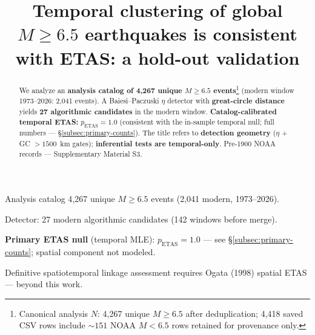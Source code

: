 \documentclass[draft]{agujournal2019}
\begin{document}
\title{Temporal clustering of global $M \ge 6.5$ earthquakes is consistent with ETAS: a hold-out validation}




\begin{abstract}
We analyze an \textbf{analysis catalog of 4{,}267 unique $M \ge 6.5$ events}\footnote{Canonical
analysis $N$: 4{,}267 unique $M \ge 6.5$ after deduplication; 4{,}418 saved CSV rows
include ${\sim}151$ NOAA $M < 6.5$ rows retained for provenance only.} (modern window
1973--2026: 2{,}041 events).
A Baiesi--Paczuski $\eta$ detector with \textbf{great-circle distance} yields
\textbf{27 algorithmic candidates} in the modern window.
\textbf{Catalog-calibrated temporal ETAS:} $p_\mathrm{ETAS}=1.0$ (consistent with the
in-sample temporal null; full numbers --- \S\ref{subsec:primary-counts}).
The title refers to \textbf{detection geometry} ($\eta$ + GC $> 1500$~km gates);
\textbf{inferential tests are temporal-only}.
Pre-1900 NOAA records --- Supplementary Material S3.
\end{abstract}

\begin{keypoints}
  \item Analysis catalog 4{,}267 unique $M \ge 6.5$ events (2{,}041 modern, 1973--2026).
  \item Detector: 27 modern algorithmic candidates (142 windows before merge).
  \item \textbf{Primary ETAS null} (temporal MLE): $p_\mathrm{ETAS}=1.0$ --- see
        \S\ref{subsec:primary-counts}; spatial component not modeled.
  \item Definitive spatiotemporal linkage assessment requires Ogata (1998) spatial ETAS
        --- beyond this work.
\end{keypoints}

\noindent{}
\end{document}
